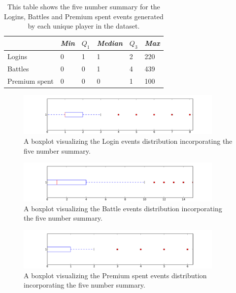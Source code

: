 \begin{center}
\begin{table}[h]
\centering
\begin{tabular}{| l | l | l | l | l | l |}
    \hline
    & \textit{Min} & $Q_1$ & \textit{Median} & $Q_3$ & \textit{Max} \\ \hline
    Logins & 0 & 1 & 1 & 2 & 220 \\ \hline
    Battles & 0 & 0 & 1 & 4 & 439 \\ \hline
    Premium spent & 0 & 0 & 0 & 1 & 100 \\ \hline
\end{tabular}
\caption{This table shows the five number summary for the Logins, Battles and Premium spent events generated by each unique player in the dataset.}
\label{tab:FiveSummaryLoginsBattlesPremium}
\end{table}

\begin{figure}[h]
\centerline{\includegraphics[width=0.9\textwidth]{Figures/boxplot_logins.pdf}}
\caption{A boxplot visualizing the Login events distribution incorporating the five number summary.}
\label{fig:boxplot_logins}
\end{figure}

\begin{figure}[h]
\centerline{\includegraphics[width=0.9\textwidth]{Figures/boxplot_battles.pdf}}
\caption{A boxplot visualizing the Battle events distribution incorporating the five number summary.}
\label{fig:boxplot_battles}
\end{figure}

\begin{figure}[h]
\centerline{\includegraphics[width=0.9\textwidth]{Figures/boxplot_premiumspent.pdf}}
\caption{A boxplot visualizing the Premium spent events distribution incorporating the five number summary.}
\label{fig:boxplot_premium}
\end{figure}
\end{center}


